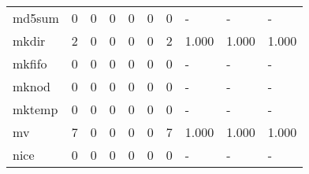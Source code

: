 \begin{longtable}{lp{1.3cm}p{1.3cm}p{1.3cm}p{1.3cm}p{1.3cm}p{1.3cm}p{1.3cm}p{1.3cm}p{1.3cm}}
md5sum    &                      0 &                                  0 &                                 0 &                                0 &                                 0 &                               0 &                                    - &                                      - &                                    - \\
mkdir     &                      2 &                                  0 &                                 0 &                                0 &                                 0 &                               2 &                                1.000 &                                  1.000 &                                1.000 \\
mkfifo    &                      0 &                                  0 &                                 0 &                                0 &                                 0 &                               0 &                                    - &                                      - &                                    - \\
mknod     &                      0 &                                  0 &                                 0 &                                0 &                                 0 &                               0 &                                    - &                                      - &                                    - \\
mktemp    &                      0 &                                  0 &                                 0 &                                0 &                                 0 &                               0 &                                    - &                                      - &                                    - \\
mv        &                      7 &                                  0 &                                 0 &                                0 &                                 0 &                               7 &                                1.000 &                                  1.000 &                                1.000 \\
nice      &                      0 &                                  0 &                                 0 &                                0 &                                 0 &                               0 &                                    - &                                      - &                                    - \\

\end{longtable}
